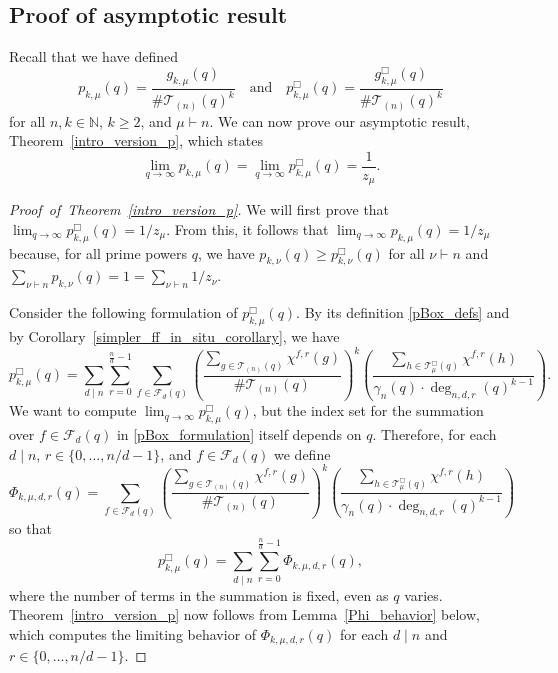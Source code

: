 \documentclass[Unicode,ALCO]{cedram}
\newcommand{\CF}{\mathcal{F}}
\newcommand{\N}{\mathbb{N}}
\newcommand{\CT}{\mathcal{T}}
\begin{document}
\subsection{Proof of asymptotic result}

Recall that we have defined
\begin{equation}
p_{k,\mu} (q) = \frac{g_{k,\mu}(q)}{\# \CT_{(n)} (q)^k}
\quad \text{and} \quad
p_{k,\mu}^\Box (q) = \frac{g_{k,\mu}^\Box(q)}{\# \CT_{(n)} (q)^k}
\end{equation}
for all \(n,k \in \N\), \(k \geq 2\), and \(\mu \vdash n\).
We can now prove our asymptotic result, Theorem~\ref{intro_version_p}, which states
\begin{equation}
\lim_{q \to \infty}
p_{k,\mu} (q)
=
\lim_{q \to \infty}
p_{k,\mu}^\Box (q)
=
\frac{1}{z_\mu}.
\end{equation}


\begin{proof}[Proof~of~Theorem~\ref{intro_version_p}]
We will first prove that \(\lim_{q \to \infty} p_{k,\mu}^\Box (q) = 1 / z_\mu\).
From this, it follows that \(\lim_{q \to \infty} p_{k,\mu} (q) = 1 / z_\mu\) because, for all prime powers \(q\), we have \(p_{k,\nu} (q) \geq p_{k,\nu}^\Box (q)\) for all \(\nu \vdash n\) and \(\sum_{\nu \vdash n} p_{k,\nu} (q) = 1 = \sum_{\nu \vdash n} 1/z_\nu\).

Consider the following formulation of \(p_{k,\mu}^\Box (q)\).
By its definition \eqref{pBox_defs} and by Corollary~\ref{simpler_ff_in_situ_corollary}, we have
\begin{equation}
\label{pBox_formulation}
p_{k,\mu}^\Box (q) =
\sum_{d \mid n}
\sum_{r = 0}^{\tfrac{n}{d} - 1}
\sum_{f \in \CF_d (q)}
\left (
\frac{\sum_{g \in \CT_{(n)}(q)} \chi^{f,r}(g)}{\# \CT_{(n)}(q)}
\right )^k
\left (
\frac{\sum_{h \in \CT^\Box_\mu(q)} \chi^{f,r}(h)}{\gamma_n(q) \cdot \deg_{n,d,r}(q)^{k-1}}
\right ).
\end{equation}
We want to compute \(\lim_{q \to \infty} p_{k,\mu}^\Box (q)\), but the index set for the summation over \(f \in \CF_d (q)\) in \eqref{pBox_formulation} itself depends on \(q\).
Therefore, for each \(d \mid n\), \(r \in \{0,\ldots,n/d-1\}\), and \(f \in \CF_d (q)\) we define
\begin{equation}
\Phi_{k,\mu,d,r} (q)
=
\sum_{f \in \CF_d (q)}
\left (
\frac{\sum_{g \in \CT_{(n)}(q)} \chi^{f,r}(g)}{\# \CT_{(n)}(q)}
\right )^k
\left (
\frac{\sum_{h \in \CT^\Box_\mu(q)} \chi^{f,r}(h)}{\gamma_n(q) \cdot \deg_{n,d,r}(q)^{k-1}}
\right )
\end{equation}
so that
\begin{equation}
p^\Box_{k,\mu} (q)
=
\sum_{d \mid n}
\sum_{r = 0}^{\tfrac{n}{d}-1}
\Phi_{k,\mu,d,r} (q),
\end{equation}
where the number of terms in the summation is fixed, even as \(q\) varies.
Theorem~\ref{intro_version_p} now follows from Lemma~\ref{Phi_behavior} below, which computes the limiting behavior of \(\Phi_{k,\mu,d,r} (q)\) for each \(d \mid n\) and \(r \in \{0,\ldots,n/d-1\}\).
\end{proof}
\end{document}

